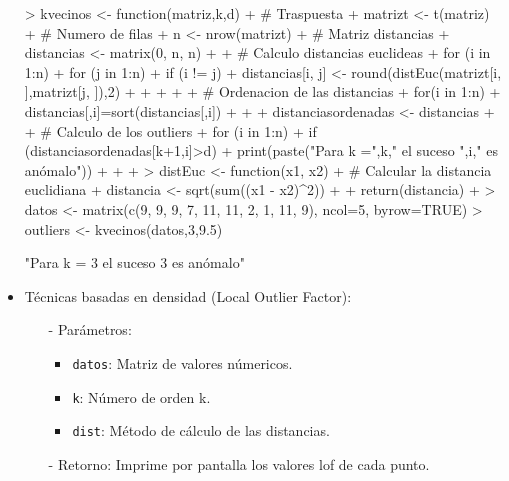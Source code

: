 \documentclass[a4paper, 12pt]{article}
\begin{document}
\begin{itemize}
\begin{itemize}
			\end{itemize}
\begin{Schunk}
\begin{Sinput}
> kvecinos <- function(matriz,k,d){
+     # Traspuesta
+     matrizt <- t(matriz)
+     # Numero de filas
+     n <- nrow(matrizt)
+     # Matriz distancias
+     distancias <- matrix(0, n, n)
+      
+     # Calculo distancias euclideas
+     for (i in 1:n) {
+         for (j in 1:n) {
+             if (i != j) {
+                 distancias[i, j] <- round(distEuc(matrizt[i, ],matrizt[j, ]),2)
+             }
+         }
+     }
+  
+     # Ordenacion de las distancias
+     for(i in 1:n){
+         distancias[,i]=sort(distancias[,i])
+     } 
+      
+     distanciasordenadas <- distancias
+ 
+     # Calculo de los outliers
+     for (i in 1:n) {
+         if (distanciasordenadas[k+1,i]>d) {
+             print(paste("Para k =",k," el suceso ",i," es anómalo"))
+         }
+     }
+ }
> distEuc <- function(x1, x2) {
+     # Calcular la distancia euclidiana
+     distancia <- sqrt(sum((x1 - x2)^2))
+    
+     return(distancia)
+ }
> datos <- matrix(c(9, 9, 9, 7, 11, 11, 2, 1, 11, 9), ncol=5, byrow=TRUE)
> outliers <- kvecinos(datos,3,9.5)
\end{Sinput}
\begin{Soutput}
[1] "Para k = 3  el suceso  3  es anómalo"
\end{Soutput}
\end{Schunk}
			\item Técnicas basadas en densidad (Local Outlier Factor):
			\begin{itemize}
				\item[-] Parámetros:
				\begin{itemize}
					\item \texttt{datos}: Matriz de valores númericos.
					\item \texttt{k}: Número de orden k.
					\item \texttt{dist}: Método de cálculo de las distancias.
				\end{itemize}

				\item[-] Retorno: Imprime por pantalla los valores lof de cada punto.
				

\end{itemize}
\end{itemize}
\end{document}
